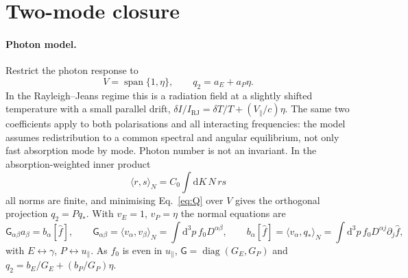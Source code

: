 \documentclass[11pt,a4paper]{article}
\numberwithin{equation}{section}
\newcommand{\dd}{\mathrm{d}}
\newcommand{\upar}{u_\parallel}
\newcommand{\fh}{\hat f}
\begin{document}
\section{Two-mode closure}\label{sec:closure}

\paragraph{Photon model.} Restrict the photon response to
\begin{equation}
V=\operatorname{span}\{1,\eta\},\qquad q_2=a_E+a_P\eta .
\end{equation}
In the Rayleigh--Jeans regime this is a radiation field at a slightly
shifted temperature with a small parallel drift,
$\delta I/I_{\mathrm{RJ}}=\delta T/T+(V_\parallel/c)\eta$. The same two coefficients
apply to both polarisations and all interacting frequencies: the model assumes
redistribution to a common spectral and angular equilibrium, not only fast
absorption mode by mode. Photon number is not an invariant. In the
absorption-weighted inner product
\begin{equation}
\langle r,s\rangle_N=C_0\int\dd K\,N\,rs
\end{equation}
all norms are finite, and minimising Eq.~\eqref{eq:Q} over $V$ gives the
orthogonal projection $q_2=Pq_*$. With $v_E=1$, $v_P=\eta$ the normal equations are
\begin{equation}
\mathsf G_{\alpha\beta}a_\beta=b_\alpha[\fh],\qquad
\mathsf G_{\alpha\beta}=\langle v_\alpha,v_\beta\rangle_N=\int\dd^3p\,f_0D^{\alpha\beta},\qquad
b_\alpha[\fh]=\langle v_\alpha,q_*\rangle_N=\int\dd^3p\,f_0D^{\alpha j}\partial_j\fh,
\end{equation}
with $E\leftrightarrow\gamma$, $P\leftrightarrow\upar$. As $f_0$ is even in
$\upar$, $\mathsf G=\operatorname{diag}(G_E,G_P)$ and $q_2=b_E/G_E+(b_P/G_P)\eta$.
\end{document}
